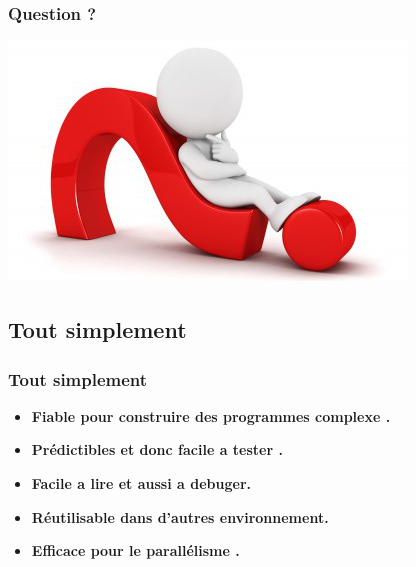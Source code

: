 \documentclass[hyperref={bookmarks=false},aspectratio=169]{beamer}
\begin{document}
\begin{frame}
\frametitle{Question ?}

\vfill
\begin{center} \includegraphics[scale=0.7]{./figures/qst.png} \\[2cm] \end{center}
\vfill

\end{frame}

\subsection{Tout simplement}



\begin{frame}
\frametitle{Tout simplement}

\begin{itemize}
\item \textbf{Fiable pour construire des programmes complexe .}

\item \textbf{Prédictibles et donc facile a tester .}

\item \textbf{Facile a lire et aussi a debuger.}

\item \textbf{Réutilisable dans d'autres environnement. }

\item \textbf{Efficace pour le parallélisme .}
\end{itemize}





\end{frame}

\end{document}
